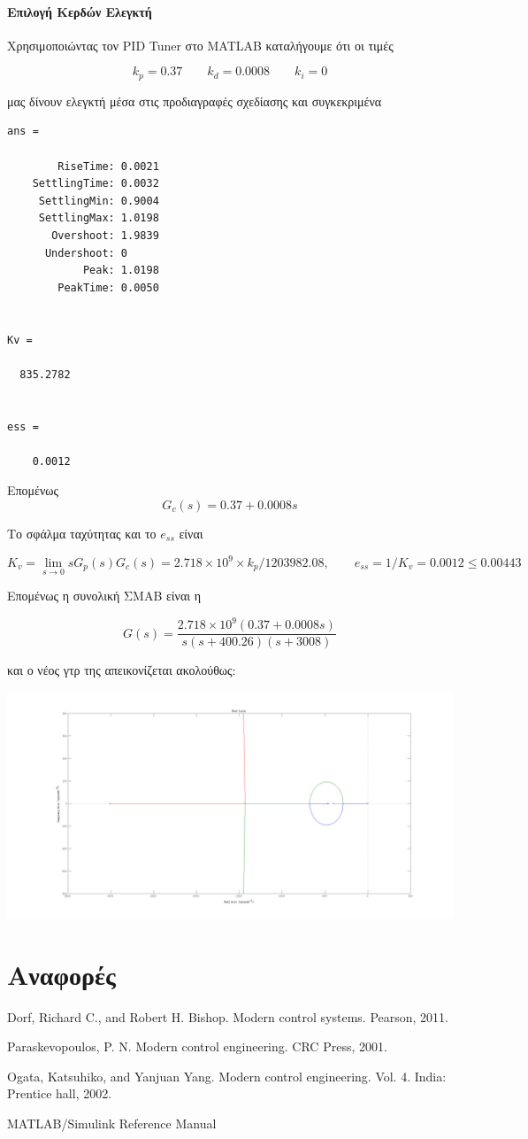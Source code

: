 \documentclass[a4paper,oneside, 10pt]{article}
\begin{document}
\paragraph{Επιλογή Κερδών Ελεγκτή} Χρησιμοποιώντας τον PID Tuner στο MATLAB καταλήγουμε ότι οι τιμές 

$$k_p = 0.37  \qquad k_d = 0.0008 \qquad k_i  = 0$$  

μας δίνουν ελεγκτή μέσα στις προδιαγραφές σχεδίασης και συγκεκριμένα

\begin{verbatim}
ans = 

        RiseTime: 0.0021
    SettlingTime: 0.0032
     SettlingMin: 0.9004
     SettlingMax: 1.0198
       Overshoot: 1.9839
      Undershoot: 0
            Peak: 1.0198
        PeakTime: 0.0050


Kv =

  835.2782


ess =

    0.0012

\end{verbatim}
  
Επομένως $$G_c(s) = 0.37 + 0.0008s$$  
  
  
Το σφάλμα ταχύτητας και το $e_{ss}$ είναι 

$$K_v = \lim_{s \to 0} s G_p(s) G_c(s) = 2.718 \times 10^9 \times k_p / 1203982.08, \qquad e_{ss} = 1 / K_v = 0.0012 \le 0.00443 $$  
  
Επομένως η συνολική ΣΜΑΒ είναι η 

$$G(s) = \frac {2.718 \times 10^9 (0.37 + 0.0008s)} {s(s + 400.26)(s + 3008)}$$  

και ο νέος γτρ της απεικονίζεται ακολούθως:

 \includegraphics[width=\textwidth]{pd2_rlocus.png}




\section*{Αναφορές}

\noindent [1] Dorf, Richard C., and Robert H. Bishop. Modern control systems. Pearson, 2011.

\noindent [2] Paraskevopoulos, P. N. Modern control engineering. CRC Press, 2001.

\noindent [3] Ogata, Katsuhiko, and Yanjuan Yang. Modern control engineering. Vol. 4. India: Prentice hall, 2002.

\noindent [4] MATLAB/Simulink Reference Manual
\end{document}
